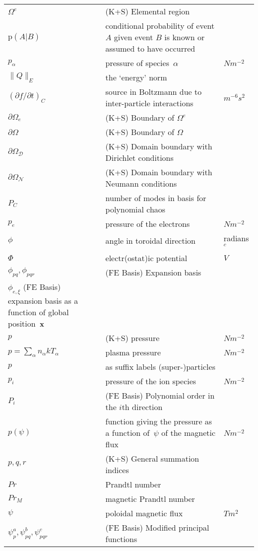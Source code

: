 \begin{longtable}{|p{3.0cm}|p{10.0cm}|p{3.0cm}|}
$\Omega^e$ &  (K+S) Elemental region & \\
$\mathrm{p}(A|B)$ & conditional probability of event $A$ given event $B$ is known or assumed to have occurred  & \\
$p_\alpha$ & pressure of species~$\alpha$  & $N m^{-2}$ \\
$\parallel  Q \parallel_E $ &the `energy' norm  & \\
$(\partial f/\partial t)_C$ & source in Boltzmann due to inter-particle interactions  & $m^{-6} s^2$ \\
$\partial \Omega_e$ &  (K+S) Boundary of $\Omega^e$ & \\
$\partial \Omega$ &  (K+S) Boundary of $\Omega$ & \\
$\partial \Omega_{\mathcal D}$ &  (K+S) Domain boundary with Dirichlet conditions & \\
$\partial \Omega_{\mathcal N}$ &  (K+S) Domain boundary with Neumann conditions & \\
$P_C$ & number of modes in basis for polynomial chaos & \\
$p_e$ & pressure of the electrons  & $N m^{-2}$ \\
$\phi$ & angle in toroidal direction & radians $^c$ \\
$\Phi$ & electr(ostat)ic potential  & $V$ \\
$\phi_{pq}, \phi_{pqr}$ &  (FE Basis) Expansion basis & \\
$\phi_{e,\xi}$ (FE Basis) expansion basis as a function of global position~${\bf x}$ & \\
$p$ & (K+S) pressure  & $N m^{-2}$ \\
$p = \sum_\alpha n_\alpha kT_\alpha$ & plasma pressure  & $N m^{-2}$ \\
$p$ & as suffix labels (super-)particles & \\
$p_i$ & pressure of the ion species  & $N m^{-2}$ \\
$P_i$ &  (FE Basis) Polynomial order in the $i$th direction & \\
$p(\psi)$ & function giving the pressure as a function of~$\psi$ of the magnetic flux  & $N m^{-2}$ \\
$p,q,r$ &  (K+S) General summation indices & \\
$Pr$ & Prandtl number & \\
$Pr_M$ & magnetic Prandtl number & \\
$\psi$ & poloidal magnetic flux  & $T m^2$ \\
$\psi^a_p, \psi^b_{pq}, \psi^c_{pqr}$ &  (FE Basis) Modified principal functions & \\

\end{longtable}
